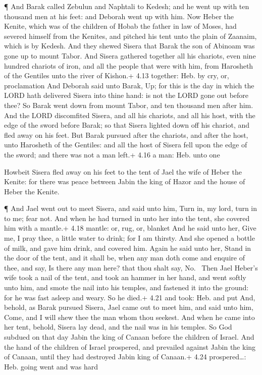  ¶ And Barak called Zebulun and Naphtali to Kedesh; and he
went up with ten thousand men at his feet: and Deborah went up with him.
 Now Heber the Kenite, which was of the children of Hobab
the father in law of Moses, had severed himself from the Kenites, and
pitched his tent unto the plain of Zaanaim, which is by Kedesh.
 And they shewed Sisera that Barak the son of Abinoam was
gone up to mount Tabor.  And Sisera gathered together all
his chariots, even nine hundred chariots of iron, and all the people
that were with him, from Harosheth of the Gentiles unto the river of
Kishon.+ 4.13 together: Heb. by cry, or, proclamation  And
Deborah said unto Barak, Up; for this is the day in which the LORD hath
delivered Sisera into thine hand: is not the LORD gone out before thee?
So Barak went down from mount Tabor, and ten thousand men after him.
 And the LORD discomfited Sisera, and all his chariots, and
all his host, with the edge of the sword before Barak; so that Sisera
lighted down off his chariot, and fled away on his feet. 
But Barak pursued after the chariots, and after the host, unto Harosheth
of the Gentiles: and all the host of Sisera fell upon the edge of the
sword; and there was not a man left.+ 4.16 a man: Heb. unto one

 Howbeit Sisera fled away on his feet to the tent of Jael
the wife of Heber the Kenite: for there was peace between Jabin the king
of Hazor and the house of Heber the Kenite.

 ¶ And Jael went out to meet Sisera, and said unto him,
Turn in, my lord, turn in to me; fear not. And when he had turned in
unto her into the tent, she covered him with a mantle.+ 4.18 mantle: or,
rug, or, blanket  And he said unto her, Give me, I pray
thee, a little water to drink; for I am thirsty. And she opened a bottle
of milk, and gave him drink, and covered him.  Again he
said unto her, Stand in the door of the tent, and it shall be, when any
man doth come and enquire of thee, and say, Is there any man here? that
thou shalt say, No.~ Then Jael Heber's wife took a nail of
the tent, and took an hammer in her hand, and went softly unto him, and
smote the nail into his temples, and fastened it into the ground: for he
was fast asleep and weary. So he died.+ 4.21 and took: Heb. and put
 And, behold, as Barak pursued Sisera, Jael came out to
meet him, and said unto him, Come, and I will shew thee the man whom
thou seekest. And when he came into her tent, behold, Sisera lay dead,
and the nail was in his temples.  So God subdued on that
day Jabin the king of Canaan before the children of Israel.
 And the hand of the children of Israel prospered, and
prevailed against Jabin the king of Canaan, until they had destroyed
Jabin king of Canaan.+ 4.24 prospered\ldots: Heb. going went and was
hard

